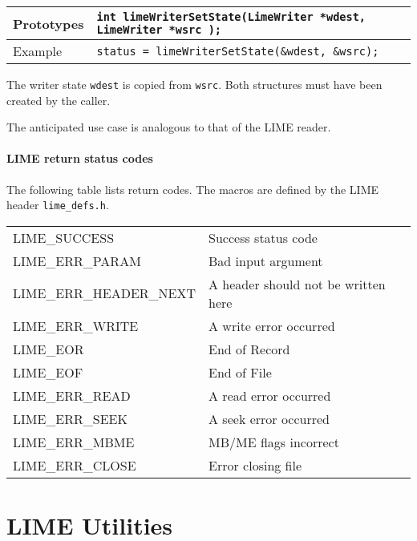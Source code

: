 \documentclass{article}
\begin{document}
%
\begin{flushleft}
  \begin{tabular}{|l|l|}
  \hline
  Prototypes     & \verb|int limeWriterSetState(LimeWriter *wdest, LimeWriter *wsrc );| \\
\hline
  Example  & \verb|status = limeWriterSetState(&wdest, &wsrc);| \\
   \hline
 \end{tabular}
\end{flushleft}
%
The writer state \verb|wdest| is copied from \verb|wsrc|.  Both
structures must have been created by the caller.  

The anticipated use case is analogous to that of the LIME reader.

\paragraph{LIME return status codes}

The following table lists return codes.  The macros are defined by the LIME
header {\tt lime\_defs.h}.

\begin{center}
  \begin{tabular}{ll}
LIME\_SUCCESS              &  Success status code \\
LIME\_ERR\_PARAM            &  Bad input argument \\
LIME\_ERR\_HEADER\_NEXT      &  A header should not be written here \\
LIME\_ERR\_WRITE            &  A write error occurred \\
LIME\_EOR                  &  End of Record \\
LIME\_EOF                  &  End of File  \\
LIME\_ERR\_READ             &  A read error occurred \\
LIME\_ERR\_SEEK             &  A seek error occurred \\
LIME\_ERR\_MBME             &  MB/ME flags incorrect \\
LIME\_ERR\_CLOSE            &  Error closing file \\
  \end{tabular}
\end{center}

\section{LIME Utilities}
\end{document}

